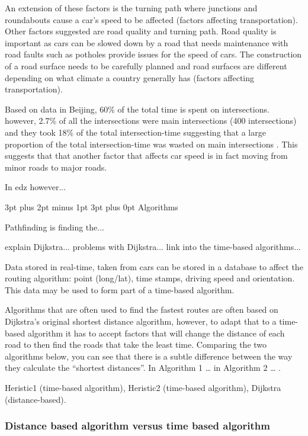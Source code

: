 \documentclass[12pt,a4paper]{article}
\makeatletter
\renewcommand\subsection{\@startsection {subsection}{1}{0mm} %
                               {3pt plus 2pt minus 1pt} %
                               {3pt plus 0pt} %
                               {\normalfont\bfseries}}
\makeatother
\begin{document}
An extension of these factors is the turning path where junctions and roundabouts cause a car’s speed to be affected (factors affecting transportation). Other factors suggested are road quality and turning path. Road quality is important as cars can be slowed down by a road that needs maintenance with road faults such as potholes provide issues for the speed of cars. The construction of a road surface needs to be carefully planned and road surfaces are different depending on what climate a country generally has (factors affecting transportation). 

Based on data in Beijing, 60\% of the total time is spent on intersections. however, 2.7\% of all the intersections were main intersections (400 intersections) and they took 18\% of the total intersection-time suggesting that a large proportion of the total intersection-time was wasted on main intersections \cite{Liu}. This suggests that that another factor that affects car speed is in fact moving from minor roads to major roads. 

In edz however...

\subsection{Algorithms}

Pathfinding is finding the...

explain Dijkstra...
problems with Dijkstra... link into the time-based algorithms...

Data stored in real-time, taken from cars can be stored in a database to affect the routing algorithm: point (long/lat), time stamps, driving speed and orientation\cite{Zheng2018}. This data may be used to form part of a time-based algorithm.

Algorithms that are often used to find the fastest routes are often based on Dijkstra’s original shortest distance algorithm, however, to adapt that to a time-based algorithm it has to accept factors that will change the distance of each road to then find the roads that take the least time. Comparing the two algorithms below, you can see that there is a subtle difference between the way they calculate the “shortest distances”. In Algorithm 1 … in Algorithm 2 … \cite{Zheng2018}.

Heristic1 (time-based algorithm), Heristic2 (time-based algorithm), Dijkstra (distance-based). \cite{Zheng2018}



\subsubsection{Distance based algorithm versus time based algorithm}
\end{document}
